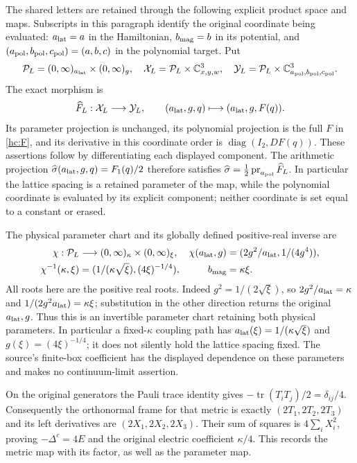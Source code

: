 The shared letters are retained through the following explicit product
space and maps. Subscripts in this paragraph identify the original
coordinate being evaluated: $a_{\rm lat}=a$ in the Hamiltonian,
$b_{\rm mag}=b$ in its potential, and $(a_{\rm pol},b_{\rm pol},c_{
\rm pol})=(a,b,c)$ in the polynomial target. Put
\[
\mathcal P_L=(0,\infty)_{a_{\rm lat}}\times(0,\infty)_g,
\quad \mathcal X_L=\mathcal P_L\times\mathbb C^3_{x,y,w},
\quad \mathcal Y_L=\mathcal P_L\times\mathbb C^3_{a_{\rm pol},b_{\rm pol},c_{\rm pol}}.
\]
The exact morphism is
\[
\widehat F_L:\mathcal X_L\longrightarrow\mathcal Y_L,
\qquad (a_{\rm lat},g,q)\longmapsto(a_{\rm lat},g,F(q)).
\]
Its parameter projection is unchanged, its polynomial projection is
the full $F$ in \eqref{hc:F}, and its derivative in this coordinate
order is $\operatorname{diag}(I_2,DF(q))$. These assertions follow by
differentiating each displayed component. The arithmetic projection
$\widehat\sigma(a_{\rm lat},g,q)=F_1(q)/2$ therefore satisfies
$\widehat\sigma=\tfrac12\operatorname{pr}_{a_{\rm pol}}\widehat F_L$.
In particular the lattice spacing is a retained parameter of the map,
while the polynomial coordinate is evaluated by its explicit component;
neither coordinate is set equal to a constant or erased.

The physical parameter chart and its globally defined positive-real inverse are
\begin{align*}
\chi:\mathcal P_L&\longrightarrow(0,\infty)_\kappa\times(0,\infty)_\xi,
&\chi(a_{\rm lat},g)&=(2g^2/a_{\rm lat},1/(4g^4)),\\
\chi^{-1}(\kappa,\xi)&=(1/(\kappa\sqrt\xi),(4\xi)^{-1/4}),
& b_{\rm mag}&=\kappa\xi.
\end{align*}
All roots here are the positive real roots. Indeed
$g^2=1/(2\sqrt\xi)$, so $2g^2/a_{\rm lat}=\kappa$ and
$1/(2g^2a_{\rm lat})=\kappa\xi$; substitution in the other direction
returns the original $a_{\rm lat},g$. Thus this is an invertible
parameter chart retaining both physical parameters. In particular a
fixed-$\kappa$ coupling path has
$a_{\rm lat}(\xi)=1/(\kappa\sqrt\xi)$ and
$g(\xi)=(4\xi)^{-1/4}$; it does not silently hold the lattice spacing
fixed. The source's finite-box coefficient has the displayed dependence
on these parameters and makes no continuum-limit assertion.

On the original generators the Pauli trace identity gives
$-\operatorname{tr}(T_iT_j)/2=\delta_{ij}/4$.
Consequently the orthonormal frame for that metric is exactly
$(2T_1,2T_2,2T_3)$ and its left derivatives are $(2X_1,2X_2,2X_3)$.
Their sum of squares is $4\sum_iX_i^2$, proving
$-\Delta^c=4E$ and the original electric coefficient $\kappa/4$.
This records the metric map with its factor, as well as the parameter map.
